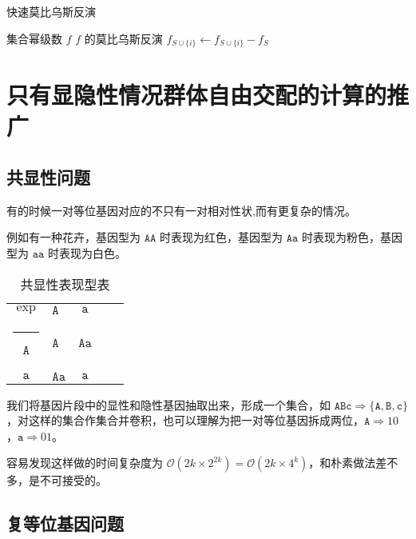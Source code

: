 \documentclass{article}
\makeatletter
\def\hlinewd#1{
\noalign{\ifnum0=`}\fi\hrule \@height #1
\futurelet\reserved@a\@xhline}
\makeatother
\begin{document}
\begin{algorithm}
    \caption{快速莫比乌斯反演}
    \begin{algorithmic}[1]
        \Require 集合幂级数 $f$
        \Ensure $f$ 的莫比乌斯反演
                    \State $f_{S \cup \{i\}} \gets f_{S \cup \{i\}} - f_{S}$
                \EndFor
            \EndFor
            \State {}
        \EndFunction
    \end{algorithmic}
\end{algorithm}

\newpage

\section{只有显隐性情况群体自由交配的计算的推广}

\subsection{共显性问题}

有的时候一对等位基因对应的不只有一对相对性状,而有更复杂的情况。

例如有一种花卉，基因型为 $\texttt{AA}$ 时表现为红色，基因型为 $\texttt{Aa}$ 时表现为粉色，基因型为 $\texttt{aa}$ 时表现为白色。

\begin{table}[htbp]
    \centering
    \caption{共显性表现型表}
    \begin{tabular}{cV{3}c|c|c}
        $\operatorname{exp}$ & $\texttt{A}$ & $\texttt{a}$ \\ \hlinewd{1pt}
        $\texttt{A}$ & $\texttt{A}$ & $$\texttt{Aa}$$ \\ \hline
        $\texttt{a}$ & $\texttt{Aa}$ & $$\texttt{a}$$
    \end{tabular}
\end{table}

我们将基因片段中的显性和隐性基因抽取出来，形成一个集合，如 $\texttt{ABc} \Rightarrow \{\texttt{A},\texttt{B},\texttt{c}\}$，对这样的集合作集合并卷积，也可以理解为把一对等位基因拆成两位，$\texttt{A} \Rightarrow 10$，$\texttt{a} \Rightarrow 01$。

容易发现这样做的时间复杂度为 $\mathcal O(2k \times 2^{2k})=\mathcal O(2k \times 4^k)$，和朴素做法差不多，是不可接受的。

\subsection{复等位基因问题}
\end{document}

